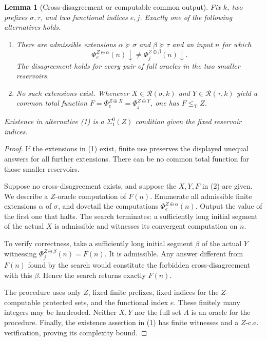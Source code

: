 \documentclass[11pt,a4paper]{article}
\newcommand{\leT}{\leq_{\mathrm T}}
\newcommand{\Res}{\mathcal R}
\newtheorem{lemma}[theorem]{Lemma}
\theoremstyle{definition}
\theoremstyle{remark}
\begin{document}
\begin{lemma}[Cross-disagreement or computable common output]
\label{lem:product}
Fix $k$, two prefixes $\sigma,\tau$, and two functional indices $e,j$.
Exactly one of the following alternatives holds.
\begin{enumerate}[label=\textup{(\arabic*)}]
\item There are admissible extensions $\alpha\succeq\sigma$ and
$\beta\succeq\tau$ and an input $n$ for which
\[
 \Phi_e^{Z\oplus\alpha}(n)\downarrow
 \ne \Phi_j^{Z\oplus\beta}(n)\downarrow.
\]
The disagreement holds for every pair of full oracles in the two smaller
reservoirs.
\item No such extensions exist. Whenever $X\in\Res(\sigma,k)$ and
$Y\in\Res(\tau,k)$ yield a common total function
$F=\Phi_e^{Z\oplus X}=\Phi_j^{Z\oplus Y}$, one has $F\leT Z$.
\end{enumerate}
Existence in alternative \textup{(1)} is a $\Sigma^0_1(Z)$ condition
given the fixed reservoir indices.
\end{lemma}
\begin{proof}
If the extensions in (1) exist, finite use preserves the displayed unequal
answers for all further extensions. There can be no common total function
for those smaller reservoirs.

Suppose no cross-disagreement exists, and suppose the $X,Y,F$ in (2)
are given. We describe a $Z$-oracle computation of $F(n)$. Enumerate all
admissible finite extensions $\alpha$ of $\sigma$, and dovetail the
computations $\Phi_e^{Z\oplus\alpha}(n)$. Output the value of the first
one that halts. The search terminates: a sufficiently long initial segment
of the actual $X$ is admissible and witnesses its convergent computation
on $n$.

To verify correctness, take a sufficiently long initial segment $\beta$
of the actual $Y$ witnessing $\Phi_j^{Z\oplus\beta}(n)=F(n)$. It is
admissible. Any answer different from $F(n)$ found by the search would
constitute the forbidden cross-disagreement with this $\beta$. Hence the
search returns exactly $F(n)$.

The procedure uses only $Z$, fixed finite prefixes, fixed indices for the
$Z$-computable protected sets, and the functional index $e$. These finitely
many integers may be hardcoded. Neither $X,Y$ nor the full set $A$ is an
oracle for the procedure. Finally, the existence assertion in (1) has
finite witnesses and a $Z$-c.e. verification, proving its complexity bound.
\end{proof}
\end{document}
